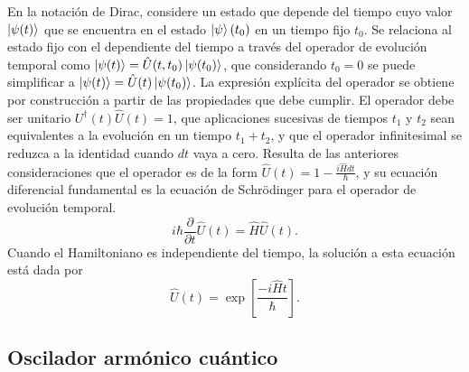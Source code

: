 En la notación de Dirac, considere un estado que depende del tiempo cuyo valor $\ket{\psi(t)}$ que se encuentra en el estado $\ket{\psi}(t_0)$ en un tiempo fijo $t_0$. Se relaciona al estado fijo con el dependiente del tiempo a través del operador de evolución temporal como $\ket{\psi(t)} = \hat{U}(t, t_0) \ket{\psi(t_0)}$, que considerando $t_0=0$ se puede simplificar a $\ket{\psi(t)} = \hat{U}(t) \ket{\psi(t_0)}$. La expresión explícita del operador se obtiene por construcción a partir de las propiedades que debe cumplir. El operador debe ser unitario $U^\dagger(t)\hat{U}(t) = 1$, que aplicaciones sucesivas de tiempos $t_1$ y $t_2$ sean equivalentes a la evolución en un tiempo $t_1+t_2$, y que el operador infinitesimal se reduzca a la identidad cuando $dt$ vaya a cero. Resulta de las anteriores consideraciones que el operador es de la form $\hat{U}(t) = 1-\frac{i\hat{H}dt}{\hbar}$, y su ecuación diferencial fundamental es la ecuación de Schrödinger para el operador de evolución temporal.
\begin{equation}
  i\hbar\frac{\partial}{\partial t} \hat{U}(t) = \hat{H}\hat{U}(t).
\end{equation}
Cuando el Hamiltoniano es independiente del tiempo, la solución a esta ecuación está dada por
\begin{equation}
  \hat{U}(t) = \exp{\left[ \frac{-i\hat{H}t}{\hbar} \right] }.
\end{equation}
\subsection{Oscilador armónico cuántico}

